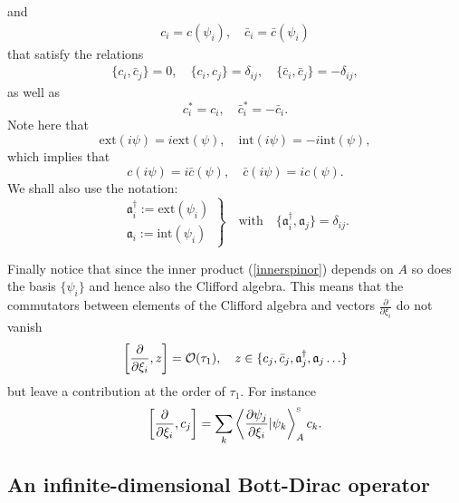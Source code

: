 \documentclass[letterpaper,11pt]{article}
\def\d{\delta}
\def\co{{\cal O}}
\newcommand{\pa}{\partial}
\begin{document}
and 
\begin{eqnarray}
c_i =  c(\psi_i) 
,\quad
\bar{c}_i = \bar{c}(\psi_i) 
\end{eqnarray}
that satisfy the relations 
\begin{eqnarray}
 \{c_i, \bar{c}_j\} = 0, \quad
 \{c_i, c_j\} = \d_{ij}, \quad
 \{\bar{c}_i, \bar{c}_j\} =- \d_{ij},
 \label{mangec}
\end{eqnarray}
as well as
$$
c_i^*= c_i, \quad \bar{c}_i^* = - \bar{c}_i.
$$
Note here that 
$$
\mbox{ext}(i\psi)= i\mbox{ext}(\psi) ,\quad  \mbox{int}(i\psi) =  -  i\mbox{int}(\psi),
$$
which implies that
\begin{equation}
c(i\psi) = i \bar{c}(\psi), \quad \bar{c}(i\psi) = i c(\psi).
\label{signc}
\end{equation}
We shall also use the notation:
\begin{equation}
\left.
\begin{array}{c}
\mathfrak{a}^\dagger_i:= \mbox{ext}(\psi_i)
\\
\mathfrak{a}_i:=  \mbox{int}(\psi_i)
\end{array}
\right\}
\quad
\mbox{with}
\quad
\{\mathfrak{a}^\dagger_i,\mathfrak{a}_j\} = \d_{ij}.
\label{rolignu}
\end{equation}

Finally notice that since the inner product (\ref{innerspinor}) depends on $A$ so does the basis $\{\psi_i\}$ and hence also the Clifford algebra. This means that the commutators between elements of the Clifford algebra and vectors $\frac{\pa}{\pa \xi_i}$ do not vanish
\begin{equation}
\left[ \frac{\pa}{\pa \xi_i}, z \right]= \co(\tau_1) ,\quad  z  \in \{c_j, \bar{c}_j, \mathfrak{a}^\dagger_j, \mathfrak{a}_j  \ldots \}
\label{nonzero}
\end{equation}
but leave a contribution at the order of $\tau_1$. For instance
$$
\left[ \frac{\pa}{\pa \xi_i}, c_j \right] = \sum_k \left\langle \frac{\pa \psi_j }{\pa \xi_i} \vert \psi_k \right\rangle_{A}^{\mbox{\tiny S}}  c_k .
$$










\subsection{An infinite-dimensional Bott-Dirac operator}
\end{document}

